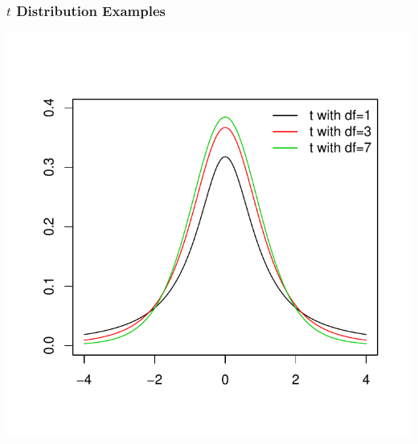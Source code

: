 \documentclass[handout]{beamer}
\begin{document}
\addtocounter{framenumber}{-1}
\begin{frame}
\frametitle{$t$ Distribution Examples}
\begin{center}
\includegraphics{figure/lec16-003}
\end{center}
\end{frame}
\end{document}
